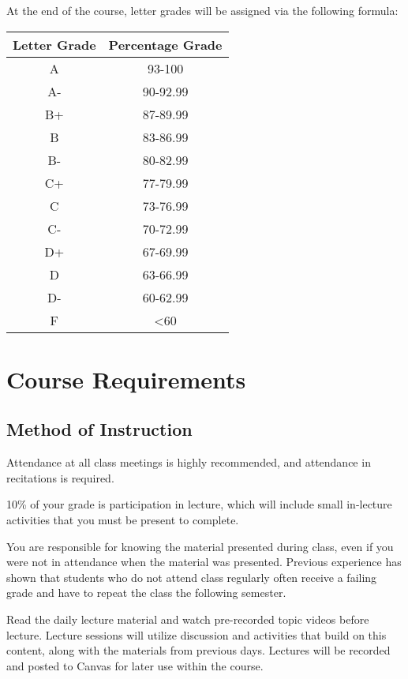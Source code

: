 At the end of the course, letter grades will be assigned via the following formula:

\begin{table}[H]
    \centering
    \begin{tabular}{|c|c|}
    Letter Grade & Percentage Grade \\ \hline
    A & 93-100 \\
    A- & 90-92.99 \\
    B+ & 87-89.99 \\
    B & 83-86.99 \\
    B- & 80-82.99 \\
    C+ & 77-79.99 \\
    C & 73-76.99 \\
    C- & 70-72.99 \\
    D+ & 67-69.99 \\
    D & 63-66.99 \\
    D- & 60-62.99 \\
    F & <60 \\
    \end{tabular}
\end{table}

\section{Course Requirements}

\subsection{Method of Instruction}

Attendance at all class meetings is highly recommended, and attendance in recitations is required.

10\% of your grade is participation in lecture, which will include small in-lecture activities that you must be present to complete.

You are responsible for knowing the material presented during class, even if you were not in attendance when the material was presented. Previous experience has shown that students who do not attend class regularly often receive a failing grade and have to repeat the class the following semester.

Read the daily lecture material and watch pre-recorded topic videos before lecture. Lecture sessions will utilize discussion and activities that build on this content, along with the materials from previous days. Lectures will be recorded and posted to Canvas for later use within the course.

